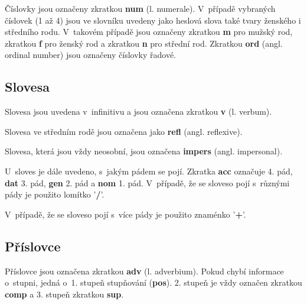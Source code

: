 Číslovky jsou označeny zkratkou \textbf{num} (l. numerale). V~případě vybraných číslovek (1 až 4) jsou ve slovníku uvedeny jako heslová slova také tvary ženského i středního rodu. V~takovém případě jsou označeny zkratkou \textbf{m} pro mužský rod, zkratkou \textbf{f} pro ženský rod a zkratkou \textbf{n} pro střední rod. Zkratkou \textbf{ord} (angl. ordinal number) jsou označeny číslovky řadové.

\blspace
  \dicEntry {} 
  \dicEntry {}  
  \dicEntry {}  
\blspace

\subsection*{Slovesa}

Slovesa jsou uvedena v~infinitivu a jsou označena zkratkou \textbf{v} (l. verbum).

\blspace
  \dicEntry {} 
\blspace

Slovesa ve středním rodě jsou označena jako \textbf{refl} (angl. reflexive).

\blspace
  \dicEntry {}  
\blspace

Slovesa, která jsou vždy neosobní, jsou označena \textbf{impers} (angl. impersonal).

\blspace
  \dicEntry {}  
\blspace

U~sloves je dále uvedeno, s~jakým pádem se pojí. Zkratka \textbf{acc} označuje 4. pád, \textbf{dat} 3. pád, \textbf{gen} 2. pád a \textbf{nom} 1. pád. V~případě, že se sloveso pojí s~různými pády je použito lomítko '\textbf{/}'.

\blspace
  \dicEntry {}  
\blspace

V~případě, že se sloveso pojí s~více pády je použito znaménko '\textbf{+}'.

\blspace
  \dicEntry {}  
\blspace

\subsection*{Příslovce}

Příslovce jsou označena zkratkou \textbf{adv} (l. adverbium). Pokud chybí informace o~stupni, jedná o~1. stupeň stupňování (\textbf{pos}). 2. stupeň je vždy označen zkratkou \textbf{comp} a 3. stupeň zkratkou \textbf{sup}.

